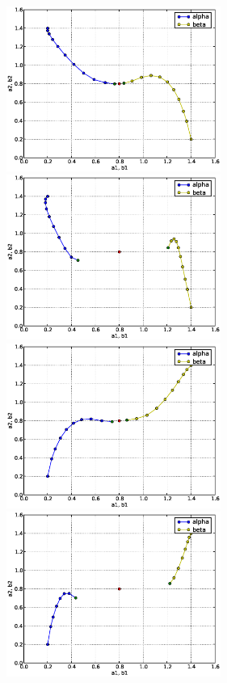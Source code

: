 \begin{figure}
  \begin{center}
    \includegraphics[width=7cm]{chapters/schroll/eps/4Dscan1.eps}
    \includegraphics[width=7cm]{chapters/schroll/eps/4Dscan1-5.eps}
    \includegraphics[width=7cm]{chapters/schroll/eps/4Dscan2.eps}
    \includegraphics[width=7cm]{chapters/schroll/eps/4Dscan2-5.eps}

\end{center}
\end{figure}
